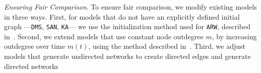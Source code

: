 
\textit{Ensuring Fair Comparison}. To ensure fair comparison, we modify existing models in three ways.
First, for models that do not have an explicitly defined initial graph ---\texttt{DMS}, \texttt{SAN}, \texttt{KA}--- we use the
initialization method used for \texttt{ARW}, described in~. Second, we extend
models that use constant node outdegree $m$, by increasing outdegree over time $m(t)$,
using the method described in~. Third, we adjust models that generate undirected networks to
create directed edges and generate directed networks 

